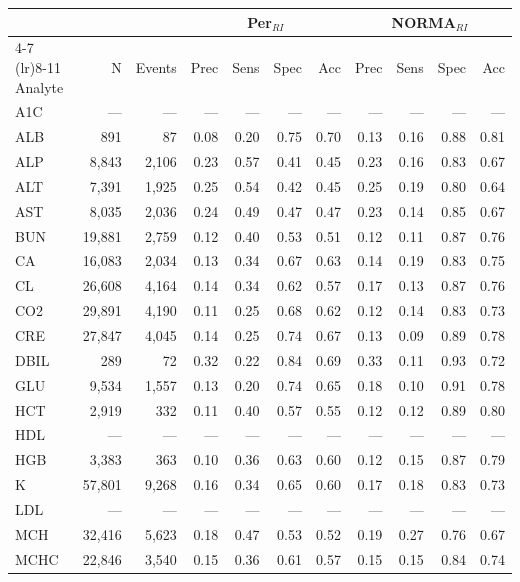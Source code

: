 \begin{table}[ht]
\centering
\footnotesize
\begin{tabular}{lrrrrrrrrrr}
\toprule
 & &  & \multicolumn{4}{c}{Per$_{RI}$} & \multicolumn{4}{c}{NORMA$_{RI}$} \\
\cmidrule(lr){4-7} \cmidrule(lr){8-11}
Analyte & N & Events & Prec & Sens & Spec & Acc & Prec & Sens & Spec & Acc \\
\midrule
A1C & --- & --- & --- & --- & --- & --- & --- & --- & --- & --- \\
ALB & 891 & 87 & 0.08 & 0.20 & 0.75 & 0.70 & 0.13 & 0.16 & 0.88 & 0.81 \\
ALP & 8,843 & 2,106 & 0.23 & 0.57 & 0.41 & 0.45 & 0.23 & 0.16 & 0.83 & 0.67 \\
ALT & 7,391 & 1,925 & 0.25 & 0.54 & 0.42 & 0.45 & 0.25 & 0.19 & 0.80 & 0.64 \\
AST & 8,035 & 2,036 & 0.24 & 0.49 & 0.47 & 0.47 & 0.23 & 0.14 & 0.85 & 0.67 \\
BUN & 19,881 & 2,759 & 0.12 & 0.40 & 0.53 & 0.51 & 0.12 & 0.11 & 0.87 & 0.76 \\
CA & 16,083 & 2,034 & 0.13 & 0.34 & 0.67 & 0.63 & 0.14 & 0.19 & 0.83 & 0.75 \\
CL & 26,608 & 4,164 & 0.14 & 0.34 & 0.62 & 0.57 & 0.17 & 0.13 & 0.87 & 0.76 \\
CO2 & 29,891 & 4,190 & 0.11 & 0.25 & 0.68 & 0.62 & 0.12 & 0.14 & 0.83 & 0.73 \\
CRE & 27,847 & 4,045 & 0.14 & 0.25 & 0.74 & 0.67 & 0.13 & 0.09 & 0.89 & 0.78 \\
DBIL & 289 & 72 & 0.32 & 0.22 & 0.84 & 0.69 & 0.33 & 0.11 & 0.93 & 0.72 \\
GLU & 9,534 & 1,557 & 0.13 & 0.20 & 0.74 & 0.65 & 0.18 & 0.10 & 0.91 & 0.78 \\
HCT & 2,919 & 332 & 0.11 & 0.40 & 0.57 & 0.55 & 0.12 & 0.12 & 0.89 & 0.80 \\
HDL & --- & --- & --- & --- & --- & --- & --- & --- & --- & --- \\
HGB & 3,383 & 363 & 0.10 & 0.36 & 0.63 & 0.60 & 0.12 & 0.15 & 0.87 & 0.79 \\
K & 57,801 & 9,268 & 0.16 & 0.34 & 0.65 & 0.60 & 0.17 & 0.18 & 0.83 & 0.73 \\
LDL & --- & --- & --- & --- & --- & --- & --- & --- & --- & --- \\
MCH & 32,416 & 5,623 & 0.18 & 0.47 & 0.53 & 0.52 & 0.19 & 0.27 & 0.76 & 0.67 \\
MCHC & 22,846 & 3,540 & 0.15 & 0.36 & 0.61 & 0.57 & 0.15 & 0.15 & 0.84 & 0.74 \\

\end{tabular}
\end{table}
